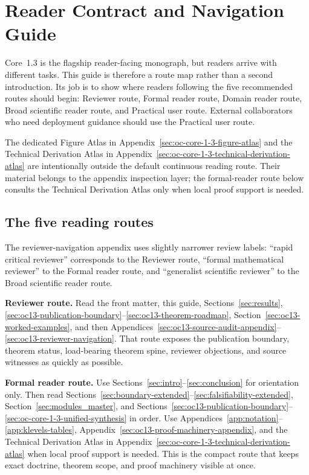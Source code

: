 \section{Reader Contract and Navigation Guide}
\label{sec:oc13-reader-contract}

Core~1.3 is the flagship reader-facing monograph, but readers arrive with
different tasks. This guide is therefore a route map rather than a second introduction.
Its job is to show where readers following the five recommended routes should begin:
Reviewer route, Formal reader route, Domain reader route, Broad scientific reader route, and Practical user route. External
collaborators who need deployment guidance should use the Practical user
route.

The dedicated Figure Atlas in
Appendix~\ref{sec:oc-core-1-3-figure-atlas} and the Technical Derivation Atlas
in Appendix~\ref{sec:oc-core-1-3-technical-derivation-atlas} are intentionally
outside the default continuous reading route. Their material belongs to the
appendix inspection layer; the formal-reader route below consults the
Technical Derivation Atlas only when local proof support is needed.

\subsection{The five reading routes}

The reviewer-navigation appendix uses slightly narrower review labels:
``rapid critical reviewer'' corresponds to the Reviewer route, ``formal
mathematical reviewer'' to the Formal reader route, and ``generalist
scientific reviewer'' to the Broad scientific reader route.

\textbf{Reviewer route.}
Read the front matter, this guide,
Sections~\ref{sec:results},
\ref{sec:oc13-publication-boundary}--\ref{sec:oc13-theorem-roadmap},
Section~\ref{sec:oc13-worked-examples},
and then
Appendices~\ref{sec:oc13-source-audit-appendix}--\ref{sec:oc13-reviewer-navigation}. That route exposes the publication boundary, theorem status,
load-bearing theorem spine, reviewer objections, and source witnesses as quickly
as possible.

\textbf{Formal reader route.}
Use Sections~\ref{sec:intro}--\ref{sec:conclusion} for orientation only.
Then read Sections~\ref{sec:boundary-extended}--\ref{sec:falsifiability-extended},
Section~\ref{sec:modules_master}, and
Sections~\ref{sec:oc13-publication-boundary}--\ref{sec:oc-core-1-3-unified-synthesis}
in order. Use Appendices~\ref{app:notation}--\ref{app:klevels-tables},
Appendix~\ref{sec:oc13-proof-machinery-appendix}, and the Technical
Derivation Atlas in Appendix~\ref{sec:oc-core-1-3-technical-derivation-atlas}
when local proof support is needed. This is the compact route that keeps
exact doctrine, theorem scope, and proof machinery visible at once.

